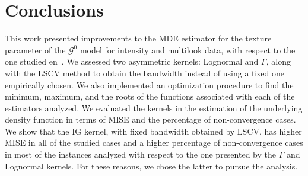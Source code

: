 \documentclass[twocolumn]{svjour3}
\begin{document}

\section{Conclusions}
\label{conclusion}

This work presented improvements to the MDE estimator for the texture parameter of the $\mathcal{G}^0$ model for intensity and multilook data, with respect to the one studied en~\cite{gambini2015}. 
We assessed two asymmetric kernels: Lognormal and $\Gamma$, along with the LSCV method to obtain the bandwidth instead of using a fixed one empirically chosen.
We also implemented an optimization procedure to find the minimum, maximum, and the roots of the functions associated with each of the estimators analyzed.
We evaluated the kernels in the estimation of the underlying density function in terms of MISE and the percentage of non-convergence cases. 
We show that the IG kernel, with fixed bandwidth obtained by LSCV, has higher MISE in all of the studied cases and a higher percentage of non-convergence cases in most of the instances analyzed with respect to the one presented by the $\Gamma$ and Lognormal kernels. 
For these reasons, we chose the latter to pursue the analysis.
\end{document}
